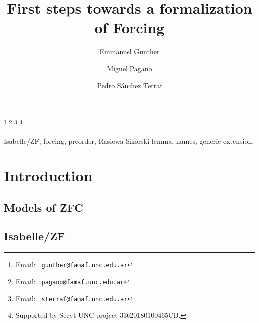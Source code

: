 \documentclass[9pt]{entcs} \usepackage{entcsmacro}
\begin{document}
\begin{frontmatter}
  \title{First steps towards a formalization of Forcing}
  \author{Emmanuel Gunther%
    }
  \address{FaMAF\\ Universidad Nacional de C\'ordoba\\
    C\'ordoba, Argentina} \author{Miguel Pagano}
  \address{FaMAF\\Universidad Nacional de C\'ordoba\\
    C\'ordoba, Argentina}
  \author{Pedro S\'anchez Terraf}
  \address{CIEM-FaMAF\\Universidad Nacional de C\'ordoba\\
    C\'ordoba, Argentina}
 \thanks[myemail]{Email:
    \href{mailto:gunther@famaf.unc.edu.ar} {\texttt{\normalshape
        gunther@famaf.unc.edu.ar}}} \thanks[coemail]{Email:
    \href{mailto:pagano@famaf.unc.edu.ar} {\texttt{\normalshape
        pagano@famaf.unc.edu.ar}}}  \thanks[co2email]{Email:
    \href{mailto:sterraf@famaf.unc.edu.ar} {\texttt{\normalshape
        sterraf@famaf.unc.edu.ar}}} 
 \thanks[ALL]{Supported by Secyt-UNC project 33620180100465CB.} 
\begin{abstract} 
\end{abstract}
\begin{keyword}
Isabelle/ZF, forcing, preorder, Rasiowa-Sikorski lemma, names, generic extension.
\end{keyword}
\end{frontmatter}

\section{Introduction}\label{sec:introduction}

\subsection{Models of ZFC}

\subsection{Isabelle/ZF}



\end{document}
